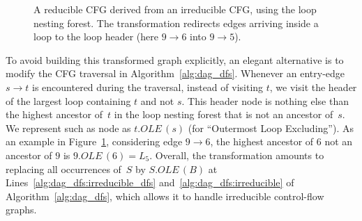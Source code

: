 \begin{figure}[t]
  \begin{center}
    \hfill
    \hfill
  \end{center}
  \caption{%
	  A reducible CFG derived from an irreducible CFG, using the loop nesting forest.
	  The transformation redirects edges arriving inside a loop to the loop header (here $9\rightarrow 6$ into $9\rightarrow 5$).}
  \label{fig:examplecfg}
\end{figure}


\newcommand{\OLE}[2]{#1.\textit{OLE}\,(#2)}

To avoid building this transformed graph explicitly, an elegant alternative is to modify the CFG traversal in Algorithm~\ref{alg:dag_dfs}.
Whenever an entry-edge $s\rightarrow t$ is encountered during the traversal, instead of visiting $t$, we visit the header of the largest loop containing $t$ and not $s$.
This header node is nothing else than the highest ancestor of~$t$ in the loop nesting forest that is not an ancestor of~$s$.
We represent such as node as $\OLE{t}{s}$ (for ``Outermost Loop Excluding'').
As an example in Figure~\ref{fig:examplecfg},
considering edge $9\rightarrow 6$, the highest ancestor of $6$ not an ancestor of $9$ is $\OLE{9}{6}=L_5$. 
Overall, the transformation amounts to replacing all occurrences of~$S$ by $\OLE{S}{B}$ at Lines~\ref{alg:dag_dfs:irreducible_dfs} and~\ref{alg:dag_dfs:irreducible} of Algorithm~\ref{alg:dag_dfs}, which allows it to handle irreducible control-flow graphs.


\newcommand{\couple}[2]{\langle#1,#2\rangle}
\def\sep{,$ $}


